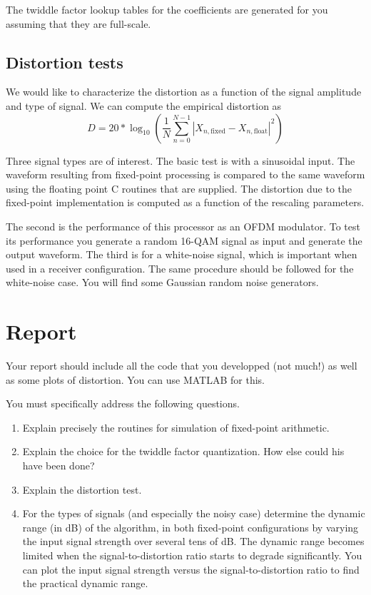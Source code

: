 \documentclass[11pt]{article}
\begin{document}
The twiddle factor lookup tables for the coefficients are generated for you assuming that they are full-scale. 



\subsection{Distortion tests}
We would like to characterize the distortion as a function of the signal amplitude and type of signal.  We can compute the empirical distortion as
\begin{equation}
D = 20*\log_{10}\left(\frac{1}{N}\sum_{n=0}^{N-1}|X_{n,\mathrm{fixed}}- X_{n,\mathrm{float}}|^2\right)
\end{equation}
  
Three signal types are of interest.  The basic test is with a sinusoidal input. The waveform resulting from fixed-point processing is compared 
to the same waveform using the floating point C routines that are supplied.  The distortion due to the fixed-point implementation 
is computed as a function of the rescaling parameters.

The second is the performance of this processor as an OFDM modulator. To test its performance you generate a
random 16-QAM signal as input and generate the output waveform.    The third is for a white-noise signal, 
which is important when used in a receiver configuration.  The same procedure should be followed for the 
white-noise case. You will find some Gaussian random noise generators.  

\section{Report}
Your report should include all the code that you developped (not much!) as well as some plots of distortion. You can use MATLAB for this. 

You must specifically address the following questions.

\begin{enumerate}
\item Explain precisely the routines for simulation of fixed-point arithmetic.
\item Explain the choice for the twiddle factor quantization.  How else could his have been done?
\item Explain the distortion test.
\item For the types of signals (and especially the noisy case) determine the dynamic range (in dB) of the algorithm, in both fixed-point configurations
by varying the input signal strength over several tens of dB.  The dynamic range becomes limited when the signal-to-distortion ratio starts to 
degrade significantly.  You can plot the input signal strength versus the signal-to-distortion ratio to find the practical dynamic range.
\end{enumerate}

\makeatother 
\end{document}
